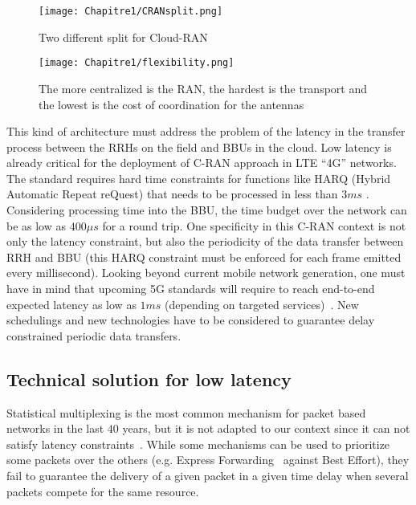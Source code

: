    \begin{figure}[h]
      \begin{center}
      \texttt{[image: Chapitre1/CRANsplit.png]}
      \end{center}
      \caption{Two different split for Cloud-RAN}\label{fig:CRANsplit}
      \end{figure}
      \begin{figure}[h]
      \begin{center}
      \texttt{[image: Chapitre1/flexibility.png]}
      \end{center}
      \caption{The more centralized is the RAN, the hardest is the transport and the lowest is the cost of coordination for the antennas}\label{fig:flexibility}
      \end{figure}
       
This kind of architecture must address the problem of the latency in the transfer process between the RRHs on the field and BBUs in the cloud. Low latency is already critical for the deployment of C-RAN approach in LTE “4G” networks. The standard requires hard time constraints for functions like HARQ (Hybrid Automatic Repeat reQuest) that needs to be processed in less than $3ms$ \cite{bouguen2012lte}. Considering processing time into the BBU, the time budget over the network can be as low as $400\mu s$ for a round trip. One specificity in this C-RAN context is not only the latency constraint, but also the periodicity of the data transfer between RRH and BBU (this HARQ constraint must be enforced for each frame emitted every millisecond). Looking beyond current mobile network generation, one must have in mind that upcoming 5G standards will require to reach end-to-end expected latency as low as $1ms$ (depending on targeted services)~\cite{boccardi2014five}. New schedulings and new technologies have to be considered to guarantee delay constrained periodic data transfers. 


\subsection{Technical solution for low latency}
Statistical multiplexing is the most common mechanism for packet based networks in the last $40$ years, but it is not adapted to our context since it can not satisfy latency constraints~\cite{khaunte2003technique}. While some mechanisms can be used to prioritize some packets over the others (e.g. Express Forwarding~\cite{exprforw} against Best Effort), they fail to guarantee the delivery of a given packet in a given time delay when several packets compete for the same resource. 

